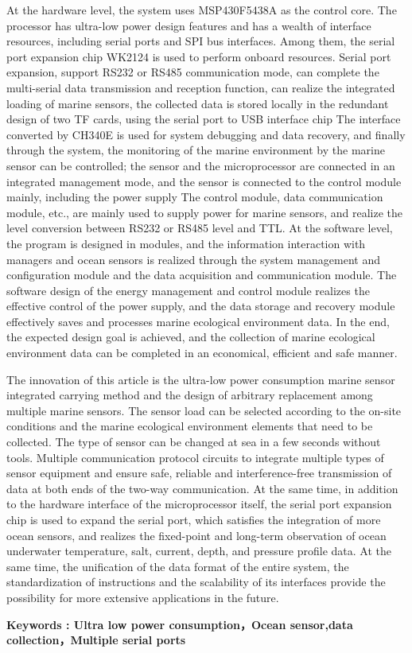 {At the hardware level, the system uses MSP430F5438A as the control core. The processor has ultra-low power design features and has a wealth of interface resources, including serial ports and SPI bus interfaces. Among them, the serial port expansion chip WK2124 is used to perform onboard resources. Serial port expansion, support RS232 or RS485 communication mode, can complete the multi-serial data transmission and reception function, can realize the integrated loading of marine sensors, the collected data is stored locally in the redundant design of two TF cards, using the serial port to USB interface chip The interface converted by CH340E is used for system debugging and data recovery, and finally through the system, the monitoring of the marine environment by the marine sensor can be controlled; the sensor and the microprocessor are connected in an integrated management mode, and the sensor is connected to the control module mainly, including the power supply The control module, data communication module, etc., are mainly used to supply power for marine sensors, and realize the level conversion between RS232 or RS485 level and TTL. At the software level, the program is designed in modules, and the information interaction with managers and ocean sensors is realized through the system management and configuration module and the data acquisition and communication module. The software design of the energy management and control module realizes the effective control of the power supply, and the data storage and recovery module effectively saves and processes marine ecological environment data. In the end, the expected design goal is achieved, and the collection of marine ecological environment data can be completed in an economical, efficient and safe manner.

The innovation of this article is the ultra-low power consumption marine sensor integrated carrying method and the design of arbitrary replacement among multiple marine sensors. The sensor load can be selected according to the on-site conditions and the marine ecological environment elements that need to be collected. The type of sensor can be changed at sea in a few seconds without tools. Multiple communication protocol circuits to integrate multiple types of sensor equipment and ensure safe, reliable and interference-free transmission of data at both ends of the two-way communication. At the same time, in addition to the hardware interface of the microprocessor itself, the serial port expansion chip is used to expand the serial port, which satisfies the integration of more ocean sensors, and realizes the fixed-point and long-term observation of ocean underwater temperature, salt, current, depth, and pressure profile data. At the same time, the unification of the data format of the entire system, the standardization of instructions and the scalability of its interfaces provide the possibility for more extensive applications in the future.
}
 
\vskip12bp
{\xiaosi\heiti\noindent 
\textbf{
Keywords :  Ultra low power consumption，Ocean sensor,data collection，Multiple serial ports}}
